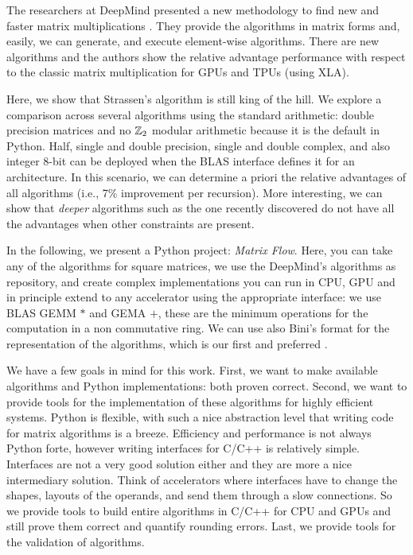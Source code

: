 \documentclass[acmsmall]{acmart}
\begin{document}
The researchers at DeepMind presented a new methodology to find new
and faster matrix multiplications \cite{PMID:36198780}. They provide
the algorithms in matrix forms and, easily, we can generate, and
execute element-wise algorithms.  There are new algorithms and the
authors show the relative advantage performance with respect to the
classic matrix multiplication for GPUs and TPUs (using XLA).

Here, we show that Strassen's algorithm \cite{STRASSEN1969} is still
king of the hill.  We explore a comparison across several algorithms
using the standard arithmetic: double precision matrices and no $\mathbb{Z}_2$
modular arithmetic because it is the default in Python. Half, single
and double precision, single and double complex, and also integer
8-bit can be deployed when the BLAS interface defines it for an
architecture. In this scenario, we can determine a priori the relative
advantages of all algorithms (i.e., 7\% improvement per
recursion). More interesting, we can show that {\em deeper} algorithms
such as the one recently discovered do not have all the advantages
when other constraints are present.

In the following, we present a Python project: {\em Matrix
  Flow}. Here, you can take any of the algorithms for square matrices,
we use the DeepMind's algorithms as repository, and create complex
implementations you can run in CPU, GPU and in principle extend to any
accelerator using the appropriate interface: we use BLAS GEMM $*$ and
GEMA $+$, these are the minimum operations for the computation in a
non commutative ring. We can use also Bini's format for the
representation of the algorithms, which is our first and preferred
\cite{Paolo2007}.

We have a few goals in mind for this work. First, we want to make
available algorithms and Python implementations: both proven
correct. Second, we want to provide tools for the implementation of
these algorithms for highly efficient systems. Python is flexible,
with such a nice abstraction level that writing code for matrix
algorithms is a breeze. Efficiency and performance is not always
Python forte, however writing interfaces for C/C++ is relatively
simple. Interfaces are not a very good solution either and they are
more a nice intermediary solution. Think of accelerators where
interfaces have to change the shapes, layouts of the operands, and
send them through a slow connections. So we provide tools to build
entire algorithms in C/C++ for CPU and GPUs and still prove them
correct and quantify rounding errors. Last, we provide tools for the
validation of algorithms.
\end{document}
